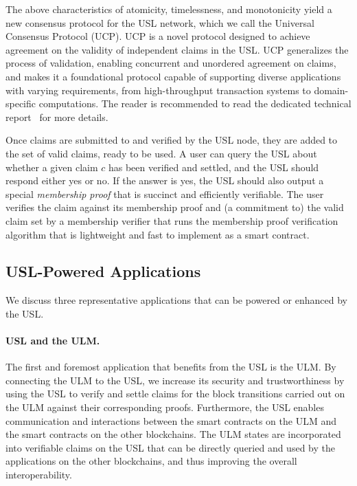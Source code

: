 \documentclass{article}
\newcommand{\ulm}{{ULM}}
\newcommand{\UniCon}{Universal Consensus Protocol}
\newcommand{\UC}{UCP}
\begin{document}
The above characteristics of atomicity, timelessness, and monotonicity yield a new consensus protocol
for the USL network, which we call the \UniCon{} (\UC{}). 
\UC{} 
is a novel protocol designed to achieve agreement on the validity of independent claims in the USL. 
\UC{} generalizes the process of validation, enabling concurrent and unordered agreement on claims,
and makes it a foundational protocol capable of supporting diverse applications with varying requirements, from high-throughput transaction systems to domain-specific computations. 
The reader is recommended to read the dedicated technical report~\cite{uc} for more details.

Once claims are submitted to and verified by the USL node, they are added to the set of valid claims, ready to be used.
A user can query the USL about whether a given claim $c$ has been verified and settled,
and the USL should respond either yes or no. 
If the answer is yes, the USL should also output a special \emph{membership proof}
that is succinct and efficiently verifiable. 
The user verifies the claim against its membership proof and (a commitment to) the valid claim set
by a membership verifier that runs the membership proof verification algorithm
that is lightweight and fast to implement as a smart contract. 




\subsection{USL-Powered Applications}

We discuss three representative applications that can be powered or enhanced by the USL. 

\paragraph{USL and the \ulm{}.\\}
The first and foremost application that benefits from the USL is the \ulm{}. 
By connecting the \ulm{} to the USL, we increase its security and trustworthiness
by using the USL to verify and settle
claims for the block transitions carried out on the \ulm{} against their corresponding proofs. 
Furthermore, the USL enables communication and interactions between
the smart contracts on the \ulm{} and the smart contracts on the other blockchains. 
The \ulm{} states are incorporated into verifiable claims on the USL 
that can be directly queried and used by the applications on the other blockchains,
and thus improving the overall interoperability.
\end{document}
